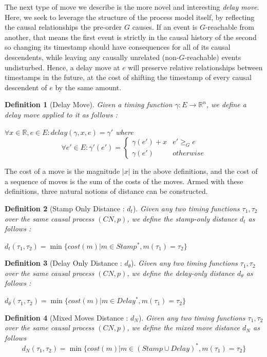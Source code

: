 \documentclass[conference]{IEEEtran}
\newcounter{cases}
\newtheorem{definition}{Definition}
\begin{document}
The next type of move we describe is the more novel and interesting \textit{delay move}. 
Here, we seek to leverage the structure of the process model itself, by reflecting the causal relationships the pre-order $G$ causes. 
If an event is $G$-reachable from another, that means the first event is strictly in the causal history of the second so changing its timestamp should have consequences for all of its causal descendents, while leaving any causally unrelated (non-$G$-reachable) events undisturbed. 
Hence, a delay move at $e$ will preserve relative relationships between timestamps in the future, at the cost of shifting the timestamp of every causal descendent of $e$ by the same amount. 
\begin{definition}[Delay Move]
	Given a timing function $\gamma : E \to \mathbb{R}^n$, we define a delay move applied to it as follows : 
	
	$\forall x \in \mathbb{R}, e \in E : delay(\gamma, x, e) = \gamma'$ where 
	$$\forall e' \in E : \gamma'(e') = \begin{cases}
		\gamma(e') + x & e' \geq_G e \\
		\gamma(e')& otherwise
	\end{cases}$$
	
\end{definition}

The cost of a move is the magnitude $|x|$ in the above definitions, and the cost of a sequence of moves is the sum of the costs of the moves. Armed with these definitions, three natural notions of distance can be constructed. 

\begin{definition}[Stamp Only Distance : $d_t$]
	Given any two timing functions $\tau_1, \tau_2$ over the same causal process $(CN, p)$, we define the stamp-only distance $d_t$ as follows : 
	
	$d_t(\tau_1, \tau_2) = \min \{cost(m) | {m \in Stamp^*}, {m(\tau_1) = \tau_2}\}$
\end{definition}

\begin{definition}[Delay Only Distance : $d_\theta$]
	Given any two timing functions $\tau_1, \tau_2$ over the same causal process $(CN, p)$, we define the delay-only distance $d_\theta$ as follows : 
	
	$d_\theta(\tau_1, \tau_2) = \min \{cost(m) | {m \in Delay^*}, {m(\tau_1) = \tau_2}\}$
\end{definition}

	\begin{definition}[Mixed Moves Distance : $d_N$]
	Given any two timing functions $\tau_1, \tau_2$ over the same causal process $(CN, p)$, we define the mixed move distance $d_N$ as follows 
	\small	$$d_N(\tau_1, \tau_2) = \min \{cost(m) | {m \in (Stamp \cup Delay)^*}, {m(\tau_1) = \tau_2}\}$$
	
\end{definition} 
\end{document}
